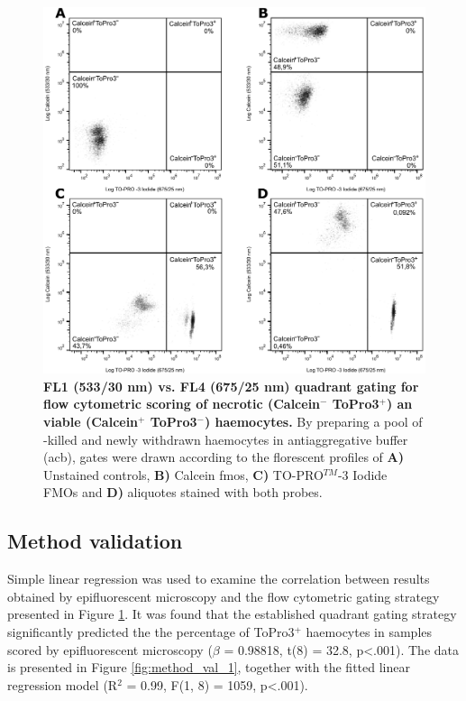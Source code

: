 \begin{figure}[h]
    \centering
    \includegraphics[width=.7\textwidth]{figures/Gating strategy/ToPro3 CAM gating strategy.pdf}
    \caption{\textbf{FL1 (533/30 nm) vs. FL4 (675/25 nm) quadrant gating for flow cytometric scoring of necrotic (Calcein$^{-}$ ToPro3$^{+}$) an viable (Calcein$^{+}$ ToPro3$^{-}$) haemocytes.} By preparing a pool of -killed and newly withdrawn haemocytes in antiaggregative buffer (\acrshort{acb}), gates were drawn according to the florescent profiles of \textbf{A)} Unstained controls, \textbf{B)} Calcein \acrshort{fmo}s, \textbf{C)} TO-PRO$^{TM}$-3 Iodide FMOs and \textbf{D)} aliquotes stained with both probes.}
    \label{fig:TP3_Calcein_gating_strat}
\end{figure}


\subsection{Method validation}
Simple linear regression was used to examine the correlation between results obtained by epifluorescent microscopy and the flow cytometric gating strategy presented in Figure \ref{fig:TP3_Calcein_gating_strat}. It was found that the established quadrant gating strategy significantly predicted the the percentage of ToPro3$^{+}$ haemocytes in samples scored by epifluorescent microscopy ($\beta$ = 0.98818, t(8) = 32.8, p<.001). The data is presented in Figure \ref{fig:method_val_1}, together with the fitted linear regression model (R$^{2}$ = 0.99, F(1, 8) = 1059, p<.001).

